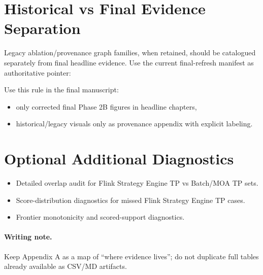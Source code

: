 \section{Historical vs Final Evidence Separation}

Legacy ablation/provenance graph families, when retained, should be catalogued separately from final headline evidence.
Use the current final-refresh manifest as authoritative pointer:

Use this rule in the final manuscript:
\begin{itemize}
    \item only corrected final Phase 2B figures in headline chapters,
    \item historical/legacy visuals only as provenance appendix with explicit labeling.
\end{itemize}

\section{Optional Additional Diagnostics}

\begin{itemize}
    \item Detailed overlap audit for Flink Strategy Engine TP vs Batch/MOA TP sets.
    \item Score-distribution diagnostics for missed Flink Strategy Engine TP cases.
    \item Frontier monotonicity and scored-support diagnostics.
\end{itemize}

\paragraph{Writing note.}
Keep Appendix A as a map of ``where evidence lives''; do not duplicate full tables already available as CSV/MD artifacts.

